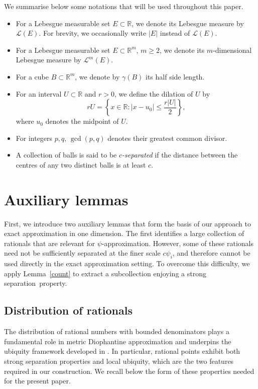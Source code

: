 \documentclass[11pt]{amsart}
\numberwithin{equation}{section}
\newcommand{\0}{\mathbf{0}}
\theoremstyle{remark}
\begin{document}
We summarise below some notations that will be used throughout this paper.
\begin{itemize}
    \item For a Lebesgue measurable set \(E\subset\mathbb R\), we denote its Lebesgue measure by
    \(\mathcal L(E)\). For brevity, we occasionally write \(|E|\) instead of \(\mathcal L(E)\).

    \item For a Lebesgue measurable set \(E\subset\mathbb R^m\), \(m\ge2\), we denote its \(m\)-dimensional Lebesgue measure by \(\mathcal L^m(E)\).

    \item For a cube \(B\subset\mathbb R^m\), we denote by \(\gamma(B)\) its half side length.

    \item For an interval \(U\subset\mathbb R\) and \(r>0\), we define the dilation of \(U\) by
    \[
    rU
    =
    \left\{
    x\in\mathbb R:
    |x-u_0|
    \le
    \frac{r|U|}{2}
    \right\},
    \]
    where \(u_0\) denotes the midpoint of \(U\).

    \item For integers \(p,q\), \(\gcd(p,q)\) denotes their greatest common divisor.

    \item A collection of balls is said to be \emph{\(c\)-separated} if the distance between the centres of any two distinct balls is at least \(c\).
\end{itemize}


\section{Auxiliary lemmas}\label{pre}
First, we introduce two auxiliary lemmas that form the basis of our
approach to exact approximation in one dimension. The first identifies a
large collection of rationals that are relevant for
\(\psi\)-approximation. However, some of these rationals need not be
sufficiently separated at the finer scale \(c\psi_i\), and therefore
cannot be used directly in the exact approximation setting. To overcome
this difficulty, we apply Lemma~\ref{count} to extract a subcollection
enjoying a strong separation~property.

\subsection{Distribution of rationals}\label{sec21}
The distribution of rational numbers with bounded denominators plays a
fundamental role in metric Diophantine approximation and underpins the
ubiquity framework developed in
\cite{BDV,DRV2, WangWu19}.
In particular, rational points exhibit both strong separation properties
and local ubiquity, which are the two features required in our
construction. We recall below the form of these properties needed for the
present paper.
\end{document}
